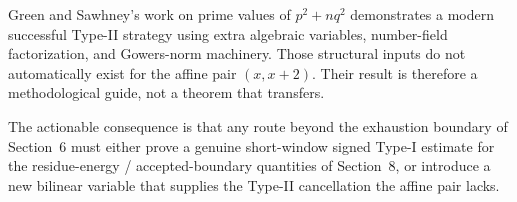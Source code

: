 Green and Sawhney's work on prime values of $p^2+nq^2$ demonstrates a modern
successful Type-II strategy using extra algebraic variables, number-field
factorization, and Gowers-norm machinery. Those structural inputs do not
automatically exist for the affine pair $(x,x+2)$. Their result is therefore
a methodological guide, not a theorem that transfers.

The actionable consequence is that any route beyond the exhaustion boundary
of Section~6 must either prove a genuine short-window signed Type-I estimate for
the residue-energy / accepted-boundary quantities of Section~8, or introduce a
new bilinear variable that supplies the Type-II cancellation the affine pair
lacks.
